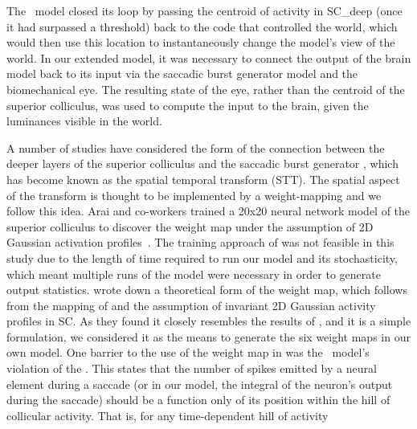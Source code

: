 \documentclass{frontiersSCNS}
\begin{document}
The \ccg~model closed its loop by passing the centroid of activity in
SC\_deep (once it had surpassed a threshold) back to the code that
controlled the world, which would then use this location to
instantaneously change the model's view of the world. In our extended
model, it was necessary to connect the output of the brain model back
to its input via the saccadic burst generator model and the
biomechanical eye. The resulting state of the eye, rather than the
centroid of the superior colliculus, was used to compute the input to
the brain, given the luminances visible in the world.

A number of studies have considered the form of the connection between
the deeper layers of the superior colliculus and the saccadic burst
generator \citep{van_gisbergen_experimental_1985,ottes_visuomotor_1986,waitzman_superior_1991,groh_converting_2001,arai_two-dimensional_1994,goossens_dynamic_2006,tabareau_geometry_2007,van_opstal_linear_2008,goossens_optimal_2012},
which has become known as the spatial temporal transform (STT).  The
spatial aspect of the transform is thought to be implemented by a
weight-mapping \citep{tabareau_geometry_2007,arai_two-dimensional_1994} and we
follow this idea.
Arai and co-workers trained a 20x20 neural network model of the
superior colliculus to discover the weight map under the assumption of
2D Gaussian activation profiles~\citep{arai_two-dimensional_1994}.
%
The training approach of \cite{arai_two-dimensional_1994} was not feasible in this study
due to the length of time required to run our model and its
stochasticity, which meant multiple runs of the model were necessary
in order to generate output statistics.
%
\cite{tabareau_geometry_2007} wrote down a theoretical form of the weight
map, which follows from the mapping of \cite{ottes_visuomotor_1986}
and the assumption of invariant 2D Gaussian activity profiles in
SC. As they found it closely resembles the
results of \cite{arai_two-dimensional_1994}, and it is a simple
formulation, we considered
it as the means to generate the six weight maps in our own model.
%
One barrier to the use of the weight map
in \cite{tabareau_geometry_2007} was the \ccg~model's violation of the
. This states that the number of spikes
emitted by a neural element during a saccade (or in our model, the
integral of the neuron's output during the saccade) should be a
function only of its position within the hill of collicular
activity. That is, for any time-dependent hill of activity
\end{document}
